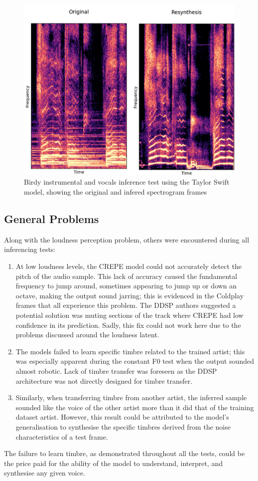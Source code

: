 \begin{figure}[H]
    \centering
    \includegraphics[width=\textwidth]{research/results/Birdy/InferenceWithInstrumentals.png}
    \caption{Birdy instrumental and vocals inference test using the Taylor Swift model, showing the original and infered spectrogram frames}
\end{figure}

\subsection{General Problems}

Along with the loudness perception problem, others were encountered during all inferencing tests:

\begin{enumerate}
    \item At low loudness levels, the CREPE model could not accurately detect the pitch of the audio sample. This lack of accuracy caused the fundamental frequency to jump around, sometimes appearing to jump up or down an octave, making the output sound jarring; this is evidenced in the Coldplay frames that all experience this problem. The DDSP authors suggested a potential solution was muting sections of the track where CREPE had low confidence in its prediction. Sadly, this fix could not work here due to the problems discussed around the loudness latent.
    \item The models failed to learn specific timbre related to the trained artist; this was especially apparent during the constant F0 test when the output sounded almost robotic. Lack of timbre transfer was foreseen as the DDSP architecture was not directly designed for timbre transfer.
    \item Similarly, when transferring timbre from another artist, the inferred sample sounded like the voice of the other artist more than it did that of the training dataset artist. However, this result could be attributed to the model's generalisation to synthesise the specific timbres derived from the noise characteristics of a test frame.
\end{enumerate}

The failure to learn timbre, as demonstrated throughout all the tests, could be the price paid for the ability of the model to understand, interpret, and synthesise any given voice.